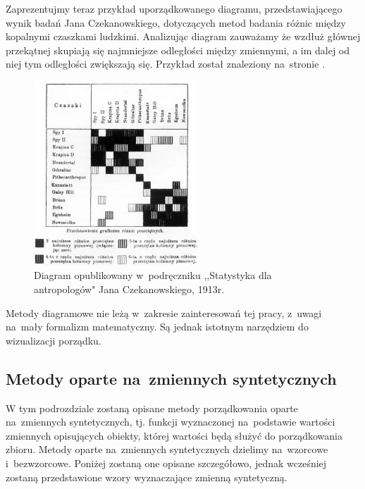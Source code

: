 \documentclass[12pt,a4paper]{report}
\begin{document}

Zaprezentujmy teraz przykład uporządkowanego diagramu, przedstawiającego wynik badań Jana Czekanowskiego, dotyczących metod badania różnic między kopalnymi czaszkami ludzkimi. Analizując diagram zauważamy że wzdłuż głównej przekątnej skupiają się najmniejsze odległości między zmiennymi, a im dalej od niej tym odległości zwiększają się. Przykład został znaleziony na~stronie \cite{czekanowski}. 
\begin{figure}[h]
\centering
\includegraphics[width=0.55\textwidth]{img/diagram_maczek.jpg}
\caption{Diagram opublikowany w~podręczniku ,,Statystyka dla antropologów" Jana Czekanowskiego, 1913r. \cite{czekanowski}}
\label{fig:obrazek1}
\end{figure}

Metody diagramowe nie leżą w~zakresie zainteresowań tej pracy, z~uwagi na~mały formalizm matematyczny. Są jednak istotnym narzędziem do wizualizacji porządku. 




\subsection{Metody oparte na~zmiennych syntetycznych}

W tym podrozdziale zostaną opisane metody porządkowania oparte na~zmiennych syntetycznych, tj. funkcji wyznaczonej na~podstawie wartości zmiennych opisujących obiekty, której wartości będą służyć do porządkowania zbioru. Metody oparte na~zmiennych syntetycznych dzielimy na~wzorcowe i~bezwzorcowe. Poniżej zostaną one opisane szczegółowo, jednak wcześniej zostaną przedstawione wzory wyznaczające zmienną syntetyczną. 
\end{document}
